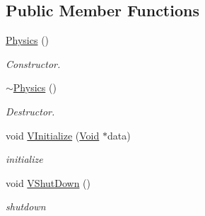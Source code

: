 \subsection*{Public Member Functions}
\begin{DoxyCompactItemize}
\item 
\hypertarget{classContent_1_1Physics_1_1PhysX_1_1Physics_a98804f05a106071d267da07611c6f229}{
\hyperlink{classContent_1_1Physics_1_1PhysX_1_1Physics_a98804f05a106071d267da07611c6f229}{Physics} ()}
\label{classContent_1_1Physics_1_1PhysX_1_1Physics_a98804f05a106071d267da07611c6f229}

\begin{DoxyCompactList}\small\item\em Constructor. \item\end{DoxyCompactList}\item 
\hypertarget{classContent_1_1Physics_1_1PhysX_1_1Physics_aa2e0b97c8ed4e57bc77b30f5a8075d16}{
\hyperlink{classContent_1_1Physics_1_1PhysX_1_1Physics_aa2e0b97c8ed4e57bc77b30f5a8075d16}{$\sim$Physics} ()}
\label{classContent_1_1Physics_1_1PhysX_1_1Physics_aa2e0b97c8ed4e57bc77b30f5a8075d16}

\begin{DoxyCompactList}\small\item\em Destructor. \item\end{DoxyCompactList}\item 
\hypertarget{classContent_1_1Physics_1_1PhysX_1_1Physics_ac7d7321af7add7b972a9939d17816987}{
void \hyperlink{classContent_1_1Physics_1_1PhysX_1_1Physics_ac7d7321af7add7b972a9939d17816987}{VInitialize} (\hyperlink{structVoid}{Void} $\ast$data)}
\label{classContent_1_1Physics_1_1PhysX_1_1Physics_ac7d7321af7add7b972a9939d17816987}

\begin{DoxyCompactList}\small\item\em initialize \item\end{DoxyCompactList}\item 
\hypertarget{classContent_1_1Physics_1_1PhysX_1_1Physics_a3eeda900a056a316b662e29cc2ac225c}{
void \hyperlink{classContent_1_1Physics_1_1PhysX_1_1Physics_a3eeda900a056a316b662e29cc2ac225c}{VShutDown} ()}
\label{classContent_1_1Physics_1_1PhysX_1_1Physics_a3eeda900a056a316b662e29cc2ac225c}

\begin{DoxyCompactList}\small\item\em shutdown \item\end{DoxyCompactList}\end{DoxyCompactItemize}
